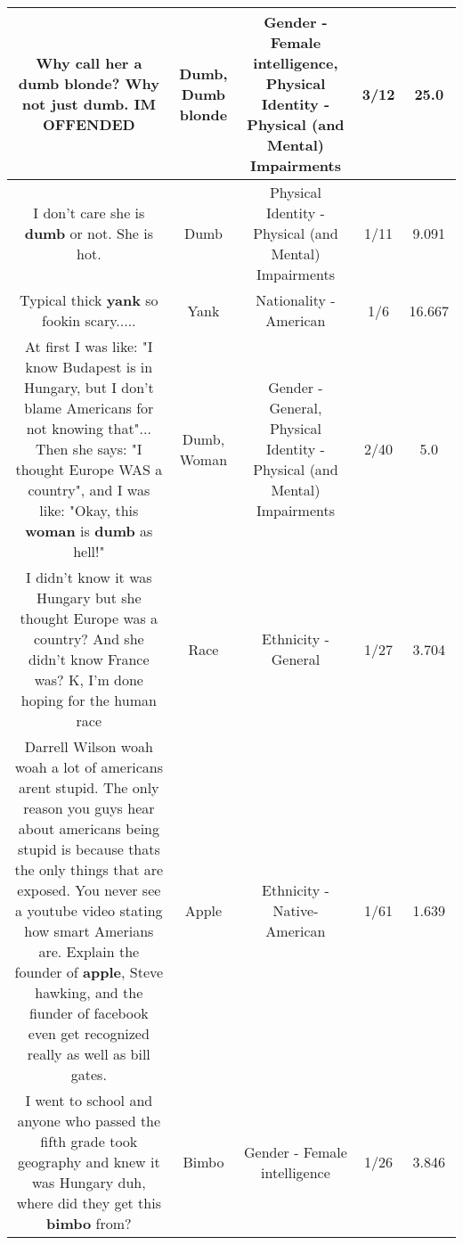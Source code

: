 \documentclass[11pt]{article}
\newlength\mylength
\begin{document}
\begin{center}
\begin{longtable}{|C{.65\mylength}|C{.30\mylength}|C{.12\mylength}|C{.12\mylength}|C{.12\mylength}|}
  \small Why call her a \textbf{d\textbf{umb} blonde}? Why not just \textbf{dumb}. IM OFFENDED\normalsize   & Dumb, Dumb blonde & Gender - Female intelligence, Physical Identity - Physical (and Mental) Impairments & 3/12 & 25.0 \\  \hline
  \small I don't care she is \textbf{dumb} or not. She is hot.\normalsize   & Dumb & Physical Identity - Physical (and Mental) Impairments & 1/11 & 9.091 \\  \hline
  \small Typical thick \textbf{yank} so fookin scary.....\normalsize   & Yank & Nationality - American & 1/6 & 16.667 \\  \hline
  \small At first I was like: "I know Budapest is in Hungary, but I don't blame Americans for not knowing that"... Then she says: "I thought Europe WAS a country", and I was like: "Okay, this \textbf{woman} is \textbf{dumb} as hell!"\normalsize   & Dumb, Woman & Gender - General, Physical Identity - Physical (and Mental) Impairments & 2/40 & 5.0 \\  \hline
  \small I didn't know it was Hungary but she thought Europe was a country? And she didn't know France was? K, I'm done hoping for the human race\normalsize   & Race & Ethnicity - General & 1/27 & 3.704 \\  \hline
  \small Darrell Wilson woah woah a lot of americans arent stupid. The only reason you guys hear about americans being stupid is because thats the only things that are exposed. You never see a youtube video stating how smart Amerians are. Explain the founder of \textbf{apple}, Steve hawking, and the fiunder of facebook even get recognized really as well as bill gates.\normalsize   & Apple & Ethnicity - Native-American & 1/61 & 1.639 \\  \hline
  \small I went to school and anyone who passed the fifth grade took geography and knew it was Hungary duh, where did they get this \textbf{bimbo} from?\normalsize   & Bimbo & Gender - Female intelligence & 1/26 & 3.846 \\  \hline

\end{longtable}
\end{center}
\end{document}
